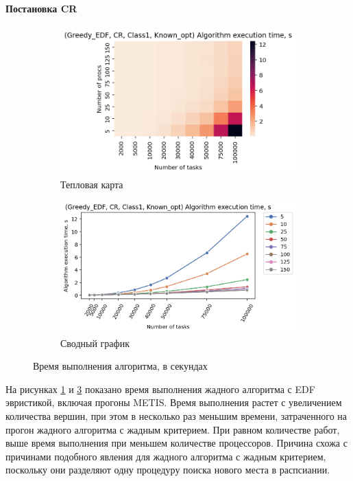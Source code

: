 \paragraph{Постановка CR}

\begin{figure}[!htbp]
    \centering
    \begin{subfigure}{0.49\textwidth}
        \includegraphics[width=\textwidth]{imgs/ideal_1/CR_EDF/et_heatmap.png}
        \caption{Тепловая карта}
        \label{fig:CR-EDF-exec-time-heatmap}
    \end{subfigure}
    \hfill
    \begin{subfigure}{0.49\textwidth}
        \includegraphics[width=\textwidth]{imgs/ideal_1/CR_EDF/tr_graph.png}
        \caption{Сводный график}
        \label{fig:CR-EDF-exec-time-compiled}
    \end{subfigure}
    \caption{Время выполнения алгоритма, в секундах}
\end{figure}

На рисунках \ref{fig:CR-EDF-exec-time-heatmap} и \ref{fig:CR-EDF-exec-time-compiled} показано время выполнения жадного алгоритма с EDF эвристикой, включая прогоны METIS. Время выполнения растет с увеличением количества вершин, при этом в несколько раз меньшим времени, затраченного на прогон жадного алгоритма с жадным критерием. При равном количестве работ, выше время выполнения при меньшем количестве процессоров. Причина схожа с причинами подобного явления для жадного алгоритма с жадным критерием, поскольку они разделяют одну процедуру поиска нового места в распсиании. 

